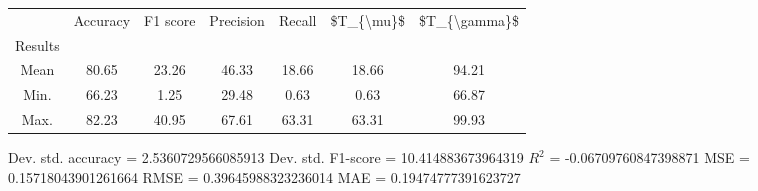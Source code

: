 \begin{tabular}{|c|c|c|c|c|c|c|}
\toprule
{} &  Accuracy &  F1 score &  Precision &  Recall &  \$T\_\{\textbackslash mu\}\$ &  \$T\_\{\textbackslash gamma\}\$ \\
Results &           &           &            &         &            &               \\
\hline
Mean    &     80.65 &     23.26 &      46.33 &   18.66 &      18.66 &         94.21 \\
Min.    &     66.23 &      1.25 &      29.48 &    0.63 &       0.63 &         66.87 \\
Max.    &     82.23 &     40.95 &      67.61 &   63.31 &      63.31 &         99.93 \\
\bottomrule
\end{tabular}

 Dev. std. accuracy = 2.5360729566085913
 Dev. std. F1-score = 10.414883673964319
 $R^2$ = -0.06709760847398871
 MSE = 0.15718043901261664
 RMSE = 0.39645988323236014
 MAE = 0.19474777391623727